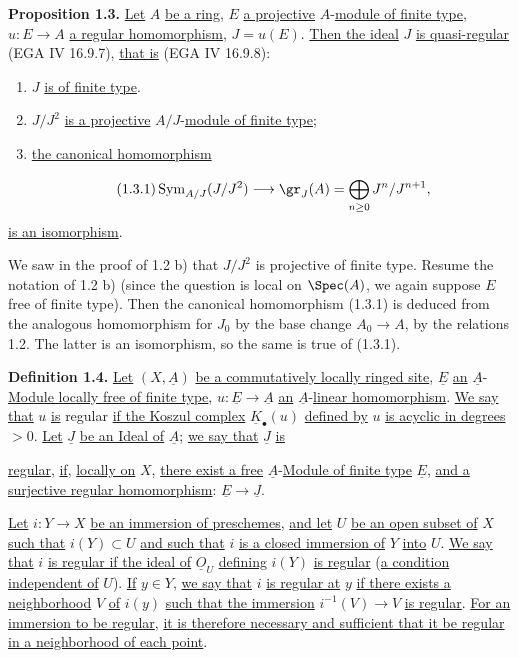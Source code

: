 \textbf{Proposition 1.3.} \uline{Let} $A$ \uline{be a ring}, $E$ \uline{a projective} $A$-\uline{module of finite type}, $u:E\longrightarrow A$ \uline{a regular homomorphism}, $J=u(E)$. \uline{Then the ideal} $J$ \uline{is quasi-regular} (EGA IV 16.9.7), \uline{that is} (EGA IV 16.9.8):
\begin{enumerate}[label=\roman*)]
\item $J$ \uline{is of finite type}.
\item $J/J^2$ \uline{is a projective} $A/J$-\uline{module of finite type};
\item \uline{the canonical homomorphism}
\end{enumerate}
\begin{equation}\tag{1.3.1}
 \Sym_{A/J}(J/J^2)\longrightarrow \gr_J(A)=\bigoplus_{n\geq0}J^n/J^{n+1},
\end{equation}
\uline{is an isomorphism}.

We saw in the proof of 1.2 b) that $J/J^2$ is projective of finite type. Resume the notation of 1.2 b) (since the question is local on $\Spec(A)$, we again suppose $E$ free of finite type). Then the canonical homomorphism (1.3.1) is deduced from the analogous homomorphism for $J_0$ by the base change $A_0\longrightarrow A$, by the relations 1.2. The latter is an isomorphism, so the same is true of (1.3.1).

\textbf{Definition 1.4.} \uline{Let} $(X,\underline{A})$ \uline{be a commutatively locally ringed site}, $\underline{E}$ \uline{an} $\underline{A}$-\uline{Module locally free of finite type}, $u:\underline{E}\longrightarrow \underline{A}$ \uline{an} $\underline{A}$-\uline{linear homomorphism}. \uline{We say that} $u$ \uline{is} regular \uline{if the Koszul complex} $\underline{K}_\bullet(u)$ \uline{defined by} $u$ \uline{is acyclic in degrees} $>0$. \uline{Let} $\underline{J}$ \uline{be an Ideal of} $\underline{A}$; \uline{we say that} $\underline{J}$ \uline{is}

%
\uline{regular}, \uline{if}, \uline{locally on} $X$, \uline{there exist a free} $\underline{A}$-\uline{Module of finite type} $\underline{E}$, \uline{and a surjective regular homomorphism}: $\underline{E}\longrightarrow \underline{J}$.

\uline{Let} $i:Y\longrightarrow X$ \uline{be an immersion of preschemes}, \uline{and let} $U$ \uline{be an open subset of} $X$ \uline{such that} $i(Y)\subset U$ \uline{and such that} $i$ \uline{is a closed immersion of} $Y$ \uline{into} $U$. \uline{We say that} $i$ \uline{is regular if the ideal of} $\underline{O}_U$ \uline{defining} $i(Y)$ \uline{is regular} (\uline{a condition independent of} $U$). \uline{If} $y\in Y$, \uline{we say that} $i$ \uline{is regular at} $y$ \uline{if there exists a neighborhood} $V$ \uline{of} $i(y)$ \uline{such that the immersion} $i^{-1}(V)\longrightarrow V$ \uline{is regular}. \uline{For an immersion to be regular}, \uline{it is therefore necessary and sufficient that it be regular in a neighborhood of each point}.

